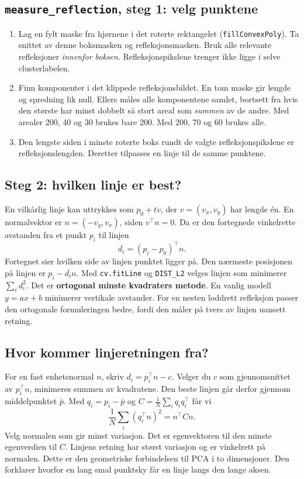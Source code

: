 \documentclass[11pt,a4paper]{article}
\newcommand{\code}[1]{\texttt{#1}}
\begin{document}
\subsection*{\texttt{measure\_reflection}, steg 1: velg punktene}
\begin{enumerate}
\item Lag en fylt maske fra hjørnene i det roterte rektangelet (\code{fillConvexPoly}). Ta snittet av denne boksmasken og refleksjonsmasken. Bruk alle relevante refleksjoner \emph{innenfor boksen}. Refleksjonspikslene trenger ikke ligge i selve clusterlabelen.
\item Finn komponenter i det klippede refleksjonsbildet. En tom maske gir lengde og spredning lik null. Ellers måles alle komponentene samlet, bortsett fra hvis den største har minst dobbelt så stort areal som \emph{summen} av de andre. Med arealer 200, 40 og 30 brukes bare 200. Med 200, 70 og 60 brukes alle.
\item Den lengste siden i minste roterte boks rundt de valgte refleksjonspikslene er refleksjonslengden. Deretter tilpasses en linje til de samme punktene.
\end{enumerate}

\subsection*{Steg 2: hvilken linje er best?}
En vilkårlig linje kan uttrykkes som $p_0+tv$, der $v=(v_x,v_y)$ har lengde én. En normalvektor er $n=(-v_y,v_x)$, siden $v^\top n=0$. Da er den fortegnede vinkelrette avstanden fra et punkt $p_i$ til linjen
\[
 d_i=(p_i-p_0)^\top n.
\]
Fortegnet sier hvilken side av linjen punktet ligger på. Den nærmeste posisjonen på linjen er $p_i-d_in$. Med \code{cv.fitLine} og \code{DIST\_L2} velges linjen som minimerer $\sum_i d_i^2$. Det er \textbf{ortogonal minste kvadraters metode}. En vanlig modell $y=ax+b$ minimerer vertikale avstander. For en nesten loddrett refleksjon passer den ortogonale formuleringen bedre, fordi den måler på tvers av linjen uansett retning.

\subsection*{Hvor kommer linjeretningen fra?}
For en fast enhetsnormal $n$, skriv $d_i=p_i^\top n-c$. Velger du $c$ som gjennomsnittet av $p_i^\top n$, minimeres summen av kvadratene. Den beste linjen går derfor gjennom middelpunktet $\bar p$. Med $q_i=p_i-\bar p$ og
$C=\frac1N\sum_i q_iq_i^\top$ får vi
\[
 \frac1N\sum_i (q_i^\top n)^2=n^\top Cn.
\]
Velg normalen som gir minst variasjon. Det er egenvektoren til den minste egenverdien til $C$. Linjens retning har størst variasjon og er vinkelrett på normalen. Dette er den geometriske forbindelsen til PCA i to dimensjoner. Den forklarer hvorfor en lang smal punktsky får en linje langs den lange aksen.
\end{document}
